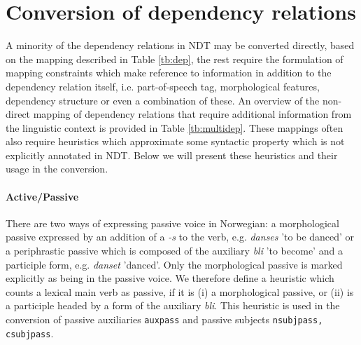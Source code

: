 \documentclass[11pt,a4paper]{article}
\begin{document}
\section{Conversion of dependency relations}
A minority of the dependency relations in NDT may be converted
directly, based on the mapping described in Table \ref{tb:dep}, the
rest require the formulation of mapping constraints which make
reference to information in addition to the dependency relation
itself, i.e. part-of-speech tag, morphological features, dependency
structure or even a combination of these. An overview of
the non-direct mapping of dependency relations that require additional
information from the linguistic context is provided in Table \ref{tb:multidep}.
These mappings often also require heuristics which approximate some
syntactic property which is not explicitly annotated in NDT. Below we
will present these heuristics and their usage in the conversion.



\paragraph{Active/Passive}There are two ways of expressing passive voice in Norwegian: a
morphological passive expressed by an addition of a {\it -s} to the
verb, e.g. {\it danses} 'to be danced' or a periphrastic passive which
is composed of the auxiliary {\it bli} 'to become' and a participle
form, e.g. {\it danset} 'danced'. Only the morphological passive is
marked explicitly as being in the passive voice.  We therefore define
a heuristic which counts a lexical main verb as passive, if it is (i)
a morphological passive, or (ii) is a participle headed by a form of
the auxiliary {\it bli}.  This heuristic is used in the conversion of
passive auxiliaries {\tt auxpass} and passive subjects {\tt nsubjpass,
  csubjpass}.
\end{document}
